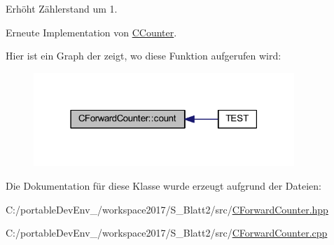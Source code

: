 Erhöht Zählerstand um 1. 



Erneute Implementation von \hyperlink{class_c_counter_a90f3e164f3fc1dcf91044702d6940c4d}{C\+Counter}.

Hier ist ein Graph der zeigt, wo diese Funktion aufgerufen wird\+:\nopagebreak
\begin{figure}[H]
\begin{center}
\leavevmode
\includegraphics[width=279pt]{class_c_forward_counter_afc451afa9f8b76f70b28c08982265a86_icgraph}
\end{center}
\end{figure}


Die Dokumentation für diese Klasse wurde erzeugt aufgrund der Dateien\+:\begin{DoxyCompactItemize}
\item 
C\+:/portable\+Dev\+Env\+\_/workspace2017/\+S\+\_\+\+Blatt2/src/\hyperlink{_c_forward_counter_8hpp}{C\+Forward\+Counter.\+hpp}\item 
C\+:/portable\+Dev\+Env\+\_/workspace2017/\+S\+\_\+\+Blatt2/src/\hyperlink{_c_forward_counter_8cpp}{C\+Forward\+Counter.\+cpp}\end{DoxyCompactItemize}
